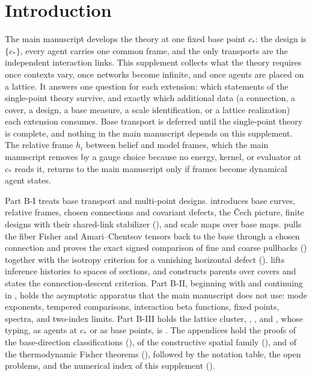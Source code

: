 \chapter{Introduction}
\label{ch:base-introduction}

The main manuscript develops the theory at one fixed base point \(c_*\): the design is \(\{c_*\}\),
every agent carries one common frame, and the only transports are the independent interaction links.
This supplement collects what the theory requires once contexts vary, once networks become infinite,
and once agents are placed on a lattice. It answers one question for each extension: which statements
of the single-point theory survive, and exactly which additional data (a connection, a cover, a design,
a base measure, a scale identification, or a lattice realization) each extension consumes. Base
transport is deferred until the single-point theory is complete, and nothing in the main manuscript
depends on this supplement. The relative frame \(h_i\) between belief and model frames, which the main
manuscript removes by a gauge choice because no energy, kernel, or evaluator at \(c_*\) reads it,
returns to the main manuscript only if frames become dynamical agent states.

Part B-I treats base transport and multi-point designs.  introduces base curves,
relative frames, chosen connections and covariant defects, the \v{C}ech picture, finite designs with
their shared-link stabilizer (), and scale maps over base maps.
 pulls the fiber Fisher and Amari--Chentsov tensors back to the base through
a chosen connection and proves the exact signed comparison of fine and coarse pullbacks
() together with the isotropy criterion for a vanishing horizontal
defect ().  lifts inference histories to
spaces of sections, and  constructs parents over covers and states the
connection-descent criterion. Part B-II, beginning with  and continuing in
, holds the asymptotic apparatus that the main manuscript does not use: mode
exponents, tempered comparisons, interaction beta functions, fixed points, spectra, and two-index
limits. Part B-III holds the lattice cluster, ,
, and , whose typing, as agents at
\(c_*\) or as base points, is . The appendices hold the proofs of the
base-direction classifications (), of the constructive spatial family
(), and of the thermodynamic Fisher theorems
(), followed by the notation table, the open problems, and
the numerical index of this supplement ().

